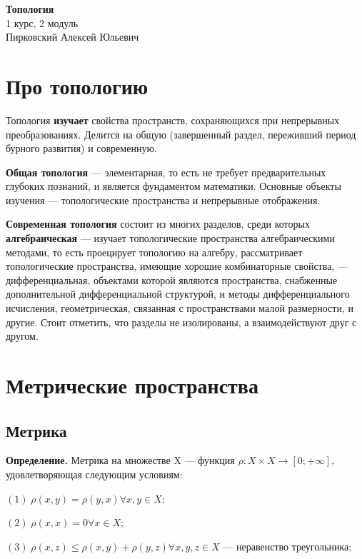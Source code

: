 \documentclass[12pt,a4paper]{article}
\begin{document}
\begin{center}
	\large \textbf{Топология} \\ 1 курс, 2 модуль\\ Пирковский Алексей Юльевич
\end{center}

\tableofcontents
\newpage 

\section{Про топологию}

Топология \textbf{изучает} свойства пространств, сохраняющихся при непрерывных преобразованиях. Делится на общую (завершенный раздел, переживший период бурного развития) и современную. 

\textbf{Общая топология} --- элементарная, то есть не требует предварительных глубоких познаний, и является фундаментом математики. Основные объекты изучения --- топологические пространства и непрерывные отображения. 

\textbf{Современная топология} состоит из многих разделов, среди которых \textbf{алгебраическая} --- изучает топологические пространства алгебраическими методами, то есть проецирует топологию на алгебру, рассматривает топологические пространства, имеющие хорошие комбинаторные свойства, --- дифференциальная, объектами которой являются пространства, снабженные дополнительной дифференциальной структурой, и методы дифференциального исчисления, геометрическая, связанная с пространствами малой размерности, и другие. Стоит отметить, что разделы не изолированы, а взаимодействуют друг с другом. 

\section{Метрические пространства}

\subsection{Метрика}

\textbf{Определение.} Метрика на множестве X --- функция $\rho: X \times X \to [0; +\infty]$, удовлетворяющая следующим условиям:

$(1) \; \rho(x, y) = \rho(y, x) \forall x, y \in X;$

$(2) \; \rho(x, x) = 0 \forall x \in X;$

$(3) \; \rho(x, z) \leqslant \rho(x, y) + \rho(y, z) \forall x, y, z \in X$ --- неравенство треугольника; 
\end{document}

